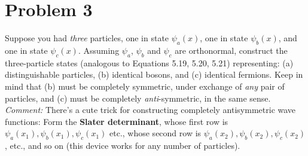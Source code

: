 \documentclass[10pt]{article}
\begin{document}
    \section*{Problem 3}

    Suppose you had \textit{three} particles, one in state $\psi_a(x)$, one in state $\psi_b(x)$, and one in state $\psi_c(x)$. Assuming $\psi_a$, $\psi_b$ and $\psi_c$ are orthonormal, construct the three-particle states (analogous to Equations 5.19, 5.20, 5.21) representing: (a) distinguishable particles, (b) identical bosons, and (c) identical fermions. Keep in mind that (b) must be completely symmetric, under exchange of \textit{any} pair of particles, and (c) must be completely \textit{anti}-symmetric, in the same sense. \textit{Comment:} There's a cute trick for constructing completely antisymmetric wave functions: Form the \textbf{Slater determinant}, whose first row is $\psi_a(x_1), \psi_b(x_1), \psi_c(x_1)$ etc., whose second row is $\psi_a(x_2), \psi_b(x_2), \psi_c(x_2)$, etc., and so on (this device works for any number of particles).
\end{document}
